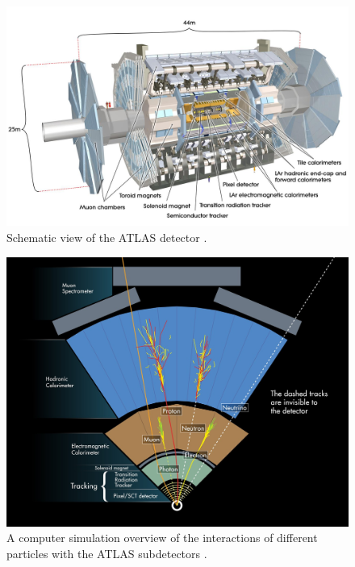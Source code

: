 \begin{figure}[H]
\centering
\includegraphics[width=14cm]{Figures/atlas-detector.jpg}
\decoRule
\caption{Schematic view of the ATLAS detector \cite{Pequenao:1095924}.}
\label{fig:atlas}
\end{figure}

\begin{figure}[H]
\centering
\includegraphics[scale=0.5]{Figures/atlas-cut.jpg}
\decoRule
\caption{A computer simulation overview of the interactions of different particles with the ATLAS subdetectors \cite{Pequenao:1505342}.}
\label{fig:atlas-cut}
\end{figure}

